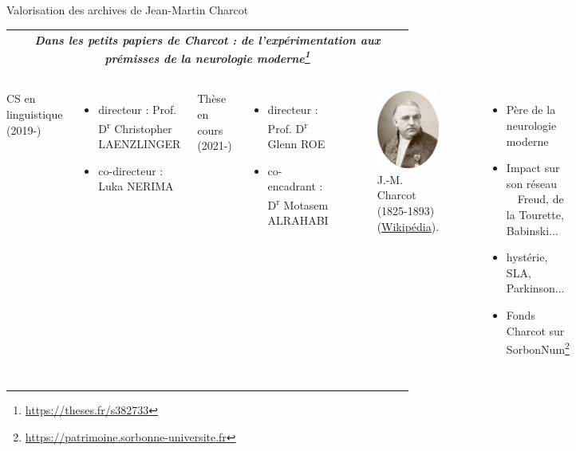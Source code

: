 \begin{frame}{Valorisation des archives de Jean-Martin Charcot}
\vspace{-3ex}
       \begin{table}[h]
\begin{tabular}{|c|}
\hline
\fontsize{9}{10}\selectfont \textit{Dans les petits papiers de Charcot : de l'expérimentation aux prémisses de la neurologie moderne\footnote{\url{https://theses.fr/s382733}}} \\ \hline
\end{tabular}
\end{table}
    \begin{columns}
    CS en linguistique (2019-)\\
    \begin{itemize}
    \footnotesize
    \item directeur : Prof. D\textsuperscript{r} Christopher LAENZLINGER
    \item co-directeur : Luka NERIMA
    \end{itemize}
       Thèse en cours (2021-)
       \begin{itemize}
       \footnotesize
       \item directeur : Prof. D\textsuperscript{r} Glenn ROE
       \item co-encadrant : D\textsuperscript{r} Motasem ALRAHABI
       \end{itemize}

        \begin{figure}
        \centering
        \includegraphics[width=.2\textwidth]{pic/Jean-Martin_Charcot-modified.png}
        \caption{J.-M. Charcot (1825-1893) (\href{https://fr.wikipedia.org/wiki/Jean-Martin_Charcot\#/media/Fichier:Jean-Martin\_Charcot.jpg}{Wikipédia}).}
        \end{figure}
        \begin{itemize}
        \small
        \item Père de la neurologie moderne
        \item Impact sur son \og{}réseau\fg{} \\
         {\footnotesize $\quad$Freud, de la Tourette, Babinski$\dots$
         }
        \item hystérie, SLA, Parkinson$\dots$
        \item Fonds Charcot sur SorbonNum\footnote{\url{https://patrimoine.sorbonne-universite.fr}}
        \end{itemize}
    \end{columns}
    

\end{frame}
